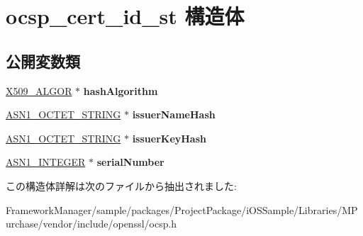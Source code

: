 \hypertarget{structocsp__cert__id__st}{}\section{ocsp\+\_\+cert\+\_\+id\+\_\+st 構造体}
\label{structocsp__cert__id__st}
\subsection*{公開変数類}
\begin{DoxyCompactItemize}
\item 
\hypertarget{structocsp__cert__id__st_ab33f458f416845b6342c235d1afa63be}{}\hyperlink{struct_x509__algor__st}{X509\+\_\+\+A\+L\+G\+O\+R} $\ast$ {\bfseries hash\+Algorithm}\label{structocsp__cert__id__st_ab33f458f416845b6342c235d1afa63be}

\item 
\hypertarget{structocsp__cert__id__st_a778948e91d91afbfd895f5a3860d8d67}{}\hyperlink{structasn1__string__st}{A\+S\+N1\+\_\+\+O\+C\+T\+E\+T\+\_\+\+S\+T\+R\+I\+N\+G} $\ast$ {\bfseries issuer\+Name\+Hash}\label{structocsp__cert__id__st_a778948e91d91afbfd895f5a3860d8d67}

\item 
\hypertarget{structocsp__cert__id__st_a46eeca1e6b207fba6e0ca844f59d6838}{}\hyperlink{structasn1__string__st}{A\+S\+N1\+\_\+\+O\+C\+T\+E\+T\+\_\+\+S\+T\+R\+I\+N\+G} $\ast$ {\bfseries issuer\+Key\+Hash}\label{structocsp__cert__id__st_a46eeca1e6b207fba6e0ca844f59d6838}

\item 
\hypertarget{structocsp__cert__id__st_a2385792d7888751bddbaa0dc150e9fbd}{}\hyperlink{structasn1__string__st}{A\+S\+N1\+\_\+\+I\+N\+T\+E\+G\+E\+R} $\ast$ {\bfseries serial\+Number}\label{structocsp__cert__id__st_a2385792d7888751bddbaa0dc150e9fbd}

\end{DoxyCompactItemize}


この構造体詳解は次のファイルから抽出されました\+:\begin{DoxyCompactItemize}
\item 
Framework\+Manager/sample/packages/\+Project\+Package/i\+O\+S\+Sample/\+Libraries/\+M\+Purchase/vendor/include/openssl/ocsp.\+h\end{DoxyCompactItemize}
